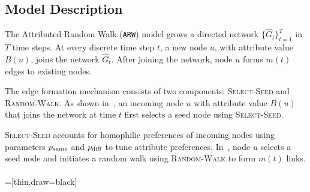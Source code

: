 \subsection{Model Description}
\label{sub:Model Description}
The Attributed Random Walk (\texttt{ARW}) model grows a directed network $\{\hat{G}_t\}^T_{t=1}$
in $T$ time steps.
At every discrete time step $t$, a
new node $u$, with attribute value $B(u)$, joins the network $\hat{G}_t$.
After joining the network, node $u$ forms $m(t)$ edges to
existing nodes.

The edge formation mechanism consists of two components: \textsc{Select-Seed} and
\textsc{Random-Walk}. As shown in~, an incoming node $u$ with attribute value $B(u)$ that joins the
network at time $t$ first selects a seed node using \textsc{Select-Seed}.

\textsc{Select-Seed} accounts for homophilic preferences of incoming nodes using
parameters $p_{\scriptsize\mbox{same}}$ and $p_{\scriptsize\mbox{diff}}$ to tune attribute preferences.
In~, node $u$ selects a seed node and initiates a
random walk using \textsc{Random-Walk} to form $m(t)$ links.
\\\\
=[thin,draw=black]


